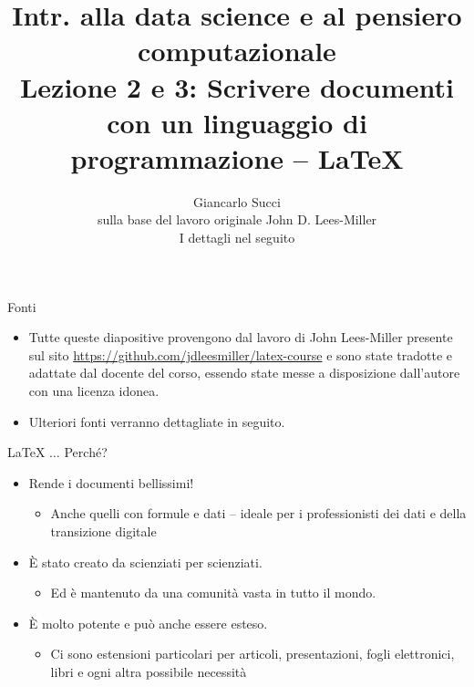 \documentclass{beamer}
\title[L01]{Intr. alla data science e al pensiero computazionale \\ Lezione 2 e 3: Scrivere documenti con un linguaggio di programmazione -- \LaTeX{}} %
\author[{\tiny Giancarlo Succi}]{Giancarlo Succi \\ sulla base del lavoro originale John D. Lees-Miller \\ I dettagli nel seguito} %
\institute[unibo] %
\date{} %
\begin{document}
\begin{frame}
\titlepage %
\end{frame}



\begin{frame}[label={L:Fonti}]
{\centerline{Fonti}}
\begin{itemize}
    \item Tutte queste diapositive provengono dal lavoro di John Lees-Miller presente sul sito \url{https://github.com/jdleesmiller/latex-course} e sono state tradotte e adattate dal docente del corso, essendo state messe a disposizione dall'autore con una licenza idonea. 
    \item Ulteriori fonti verranno dettagliate in seguito.
\end{itemize}
\end{frame}

\begin{frame}
{\centerline{\LaTeX{} $\ldots{}$ Perch\'{e}?}}
\begin{itemize}
\item Rende i documenti bellissimi!
\begin{itemize}
\item Anche quelli con formule e dati -- ideale per i professionisti dei dati e della transizione digitale
\end{itemize}
%
\item \`{E} stato creato da scienziati per scienziati.
\begin{itemize}
\item Ed \`{e} mantenuto da una comunit\`{a} vasta in tutto il mondo.
\end{itemize}
%
\item \`{E} molto potente e pu\`{o} anche essere esteso.
\begin{itemize}
\item Ci sono estensioni particolari per articoli, presentazioni, fogli elettronici, libri e ogni altra possibile necessit\`{a}
\end{itemize}
\end{itemize}
\end{frame}
\end{document}
